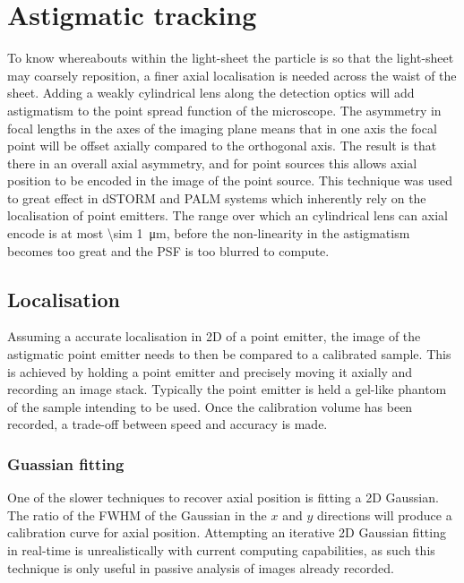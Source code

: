 \section{Astigmatic tracking}

To know whereabouts within the light-sheet the particle is so that the light-sheet may coarsely reposition, a finer axial localisation is needed across the waist of the sheet.
Adding a weakly cylindrical lens along the detection optics will add astigmatism to the point spread function of the microscope.
The asymmetry in focal lengths in the axes of the imaging plane means that in one axis the focal point will be offset axially compared to the orthogonal axis.
The result is that there in an overall axial asymmetry, and for point sources this allows axial position to be encoded in the image of the point source.
This technique was used to great effect in dSTORM and PALM systems which inherently rely on the localisation of point emitters.
The range over which an cylindrical lens can axial encode is at most \SI{\sim 1}{\micro\metre}, before the non-linearity in the astigmatism becomes too great and the PSF is too blurred to compute.

\subsection{Localisation}

Assuming a accurate localisation in 2D of a point emitter, the image of the astigmatic point emitter needs to then be compared to a calibrated sample.
This is achieved by holding a point emitter and precisely moving it axially and recording an image stack.
Typically the point emitter is held a gel-like phantom of the sample intending to be used.
Once the calibration volume has been recorded, a trade-off between speed and accuracy is made.

\subsubsection{Guassian fitting}
One of the slower techniques to recover axial position is fitting a 2D Gaussian.
The ratio of the FWHM of the Gaussian in the $x$ and $y$ directions will produce a calibration curve for axial position.
Attempting an iterative 2D Gaussian fitting in real-time is unrealistically with current computing capabilities, as such this technique is only useful in passive analysis of images already recorded.

